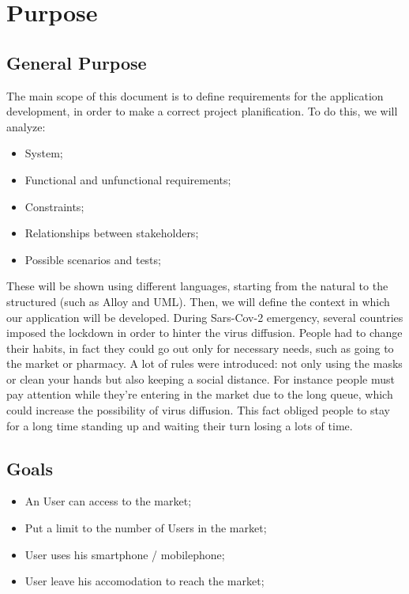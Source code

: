 \section{Purpose}
\subsection{General Purpose}

The main scope of this document is to define requirements for the application development, in order to make a correct project planification. 
To do this, we will analyze:

\begin{itemize}
\item System;
\item Functional and unfunctional requirements;
\item Constraints;
\item Relationships between stakeholders;
\item Possible scenarios and tests;
\end{itemize}
\medskip
These will be shown using different languages, starting from the natural to the structured (such as Alloy and UML).
Then, we will define the context in which our application will be developed.
During Sars-Cov-2 emergency, several countries imposed the lockdown in order to hinter the virus diffusion.
People had to change their habits, in fact they could go out only for necessary needs, such as going to the market or pharmacy.
A lot of rules were introduced: not only using the masks or clean your hands but also keeping a social distance.
For instance people must pay attention while they're entering in the market due to the long queue, which could increase the possibility of virus diffusion.
This fact obliged people to stay for a long time standing up and waiting their turn losing a lots of time. 


\subsection{Goals}


\begin{itemize}
    \item An User can access to the market;
    \item Put a limit to the number of Users in the market;
    \item User uses his smartphone / mobilephone;
    \item User leave his accomodation to reach the market;
\end{itemize}

